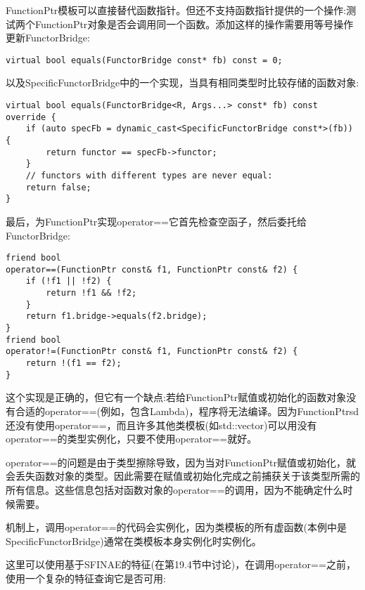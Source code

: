 FunctionPtr模板可以直接替代函数指针。但还不支持函数指针提供的一个操作:测试两个FunctionPtr对象是否会调用同一个函数。添加这样的操作需要用等号操作更新FunctorBridge:

\begin{lstlisting}[style=styleCXX]
virtual bool equals(FunctorBridge const* fb) const = 0;
\end{lstlisting}

以及SpecificFunctorBridge中的一个实现，当具有相同类型时比较存储的函数对象:

\begin{lstlisting}[style=styleCXX]
virtual bool equals(FunctorBridge<R, Args...> const* fb) const override {
	if (auto specFb = dynamic_cast<SpecificFunctorBridge const*>(fb)) {
		return functor == specFb->functor;
	}
	// functors with different types are never equal:
	return false;
}
\end{lstlisting}

最后，为FunctionPtr实现operator==它首先检查空函子，然后委托给FunctorBridge:

\begin{lstlisting}[style=styleCXX]
friend bool
operator==(FunctionPtr const& f1, FunctionPtr const& f2) {
	if (!f1 || !f2) {
		return !f1 && !f2;
	}
	return f1.bridge->equals(f2.bridge);
}
friend bool
operator!=(FunctionPtr const& f1, FunctionPtr const& f2) {
	return !(f1 == f2);
}
\end{lstlisting}

这个实现是正确的，但它有一个缺点:若给FunctionPtr赋值或初始化的函数对象没有合适的operator==(例如，包含Lambda)，程序将无法编译。因为FunctionPtrsd还没有使用operator==，而且许多其他类模板(如std::vector)可以用没有operator==的类型实例化，只要不使用operator==就好。

operator==的问题是由于类型擦除导致，因为当对FunctionPtr赋值或初始化，就会丢失函数对象的类型。因此需要在赋值或初始化完成之前捕获关于该类型所需的所有信息。这些信息包括对函数对象的operator==的调用，因为不能确定什么时候需要。

\begin{tcolorbox}[colback=webgreen!5!white,colframe=webgreen!75!black]
\hspace*{0.75cm}机制上，调用operator==的代码会实例化，因为类模板的所有虚函数(本例中是SpecificFunctorBridge)通常在类模板本身实例化时实例化。
\end{tcolorbox}

这里可以使用基于SFINAE的特征(在第19.4节中讨论)，在调用operator==之前，使用一个复杂的特征查询它是否可用:

